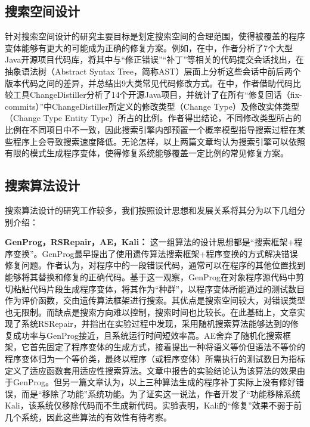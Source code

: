 \subsection{搜索空间设计}
针对搜索空间设计的研究主要目标是划定搜索空间的合理范围，使得被覆盖的程序变体能够有更大的可能成为正确的修复方案。例如，在\cite{pan2009toward}中，作者分析了7个大型Java开源项目代码库，将其中与“修正错误”“补丁”等相关的代码提交会话找出，在抽象语法树（Abstract Syntax Tree，简称AST）层面上分析这些会话中前后两个版本代码之间的差异，并总结出9大类常见代码修改方式。在\cite{martinez2015mining}中，作者借助代码比较工具ChangeDistiller\cite{changedistiller:4339230}分析了14个开源Java项目，并统计了在所有“修复回话（fix-commits）”中ChangeDistiller所定义的修改类型（Change Type）及修改实体类型（Change Type Entity Type）所占的比例。作者得出结论，不同修改类型所占的比例在不同项目中不一致，因此搜索引擎内部预置一个概率模型指导搜索过程在某些程序上会导致搜索速度降低。无论怎样，以上两篇文章均认为搜索引擎可以依照有限的模式生成程序变体，使得修复系统能够覆盖一定比例的常见修复方案。

\subsection{搜索算法设计}

搜索算法设计的研究工作较多，我们按照设计思想和发展关系将其分为以下几组分别介绍：

\textbf{GenProg，RSRepair，AE，Kali：}
这一组算法的设计思想都是“搜索框架+程序变换”。GenProg\cite{6035728}\cite{6227211}最早提出了使用遗传算法搜索框架+程序变换的方式解决错误修复问题。作者认为，对程序中的一段错误代码，通常可以在程序的其他位置找到能够将其替换和修复的正确代码。基于这一观察，GenProg在对象程序源代码中剪切粘贴代码片段生成程序变体，将其作为“种群”，以程序变体所能通过的测试数目作为评价函数，交由遗传算法框架进行搜索。其优点是搜索空间较大，对错误类型也无限制。而缺点是搜索方向难以控制，搜索时间也比较长。在此基础上，文章\cite{Qi:2014:SRS:2568225.2568254}实现了系统RSRepair，并指出在实验过程中发现，采用随机搜索算法能够达到的修复成功率与GenProg接近，且系统运行时间短效率高。AE\cite{6693094}舍弃了随机化搜索框架，它首先固定了程序变体的生成方式，接着提出一种将语义等价但语法不等价的程序变体归为一个等价类，最终以程序（或程序变体）所需执行的测试数目为指标定义了适应函数套用适应性搜索算法。文章中报告的实验结论认为该算法的效果由于GenProg。但另一篇文章\cite{qi2015analysis}认为，以上三种算法生成的程序补丁实际上没有修好错误，而是“移除了功能”系统功能。为了证实这一说法，作者开发了“功能移除系统Kali，该系统仅移除代码而不生成新代码。实验表明，Kali的“修复”效果不弱于前几个系统，因此这些算法的有效性有待考察。

